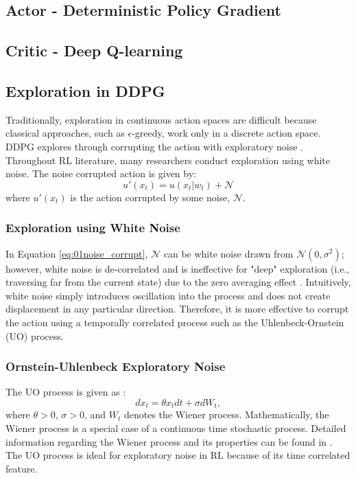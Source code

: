 \subsection{Actor - Deterministic Policy Gradient}
\subsection{Critic - Deep Q-learning}


\subsection{Exploration in DDPG}
Traditionally, exploration in continuous action spaces are difficult because classical approaches, such as $\epsilon$-greedy, work only in a discrete action space.  DDPG explores through corrupting the action with exploratory noise \cite{ddpg}.  Throughout RL literature, many researchers conduct exploration using white noise. The noise corrupted action is given by:
\begin{equation}
    u'(x_t) = u(x_t|w_t) + \mathcal{N}
    \label{eq:01noise_corrupt}
\end{equation}
where $u'(x_t)$ is the action corrupted by some noise, $\mathcal{N}$.

\subsubsection{Exploration using White Noise}
In Equation \ref{eq:01noise_corrupt}, $\mathcal{N}$ can be white noise drawn from $\mathcal{N}(0, \sigma^2)$; however, white noise is de-correlated and is ineffective for "deep" exploration (i.e., traversing far from the current state) due to the zero averaging effect \cite{white_noise}. Intuitively, white noise simply introduces oscillation into the process and does not create displacement in any particular direction. Therefore, it is more effective to corrupt the action using a temporally correlated process such as the Uhlenbeck-Ornstein (UO) process.

\subsubsection{Ornstein-Uhlenbeck Exploratory Noise}

The UO process is given as \cite{ornstein}:
\begin{equation}
    dx_t = \theta x_t dt + \sigma dW_t,
    \label{eq:01OU}
\end{equation}
where $\theta > 0$, $\sigma > 0$, and $W_t$ denotes the Wiener process. Mathematically, the Wiener process is a special case of a continuous time stochastic process. Detailed information regarding the Wiener process and its properties can be found in \cite{wiener}. The UO process is ideal for exploratory noise in RL because of its time correlated feature.

